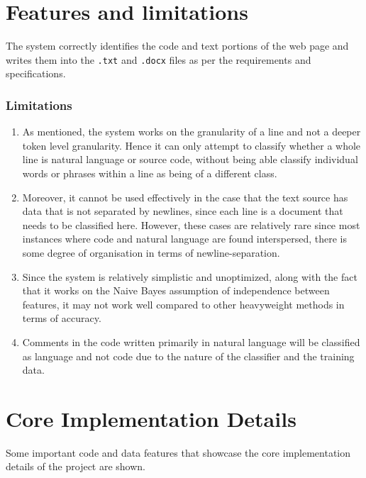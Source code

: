 \documentclass[12pt]{scrreprt}
\begin{document}



\section{Features and limitations}
The system correctly identifies the code and text portions of the web page and writes them into the \texttt{.txt} and \texttt{.docx} files as per the requirements and specifications. 

\subsubsection{Limitations}

\begin{enumerate}
    \item As mentioned, the system works on the granularity of a line and not a deeper token level granularity. Hence it can only attempt to classify whether a whole line is natural language or source code, without being able classify individual words or phrases within a line as being of a different class.
    \item Moreover, it cannot be used effectively in the case that the text source has data that is not separated by newlines, since each line is a document that needs to be classified here. However, these cases are relatively rare since most instances where code and natural language are found interspersed, there is some degree of organisation in terms of newline-separation.
    \item Since the system is relatively simplistic and unoptimized, along with the fact that it works on the Naive Bayes assumption of independence between features, it may not work well compared to other heavyweight methods in terms of accuracy. 
    \item Comments in the code written primarily in natural language will be classified as language and not code due to the nature of the classifier and the training data.
\end{enumerate}

\section{Core Implementation Details}

Some important code and data features that showcase the core implementation details of the project are shown.
\end{document}
